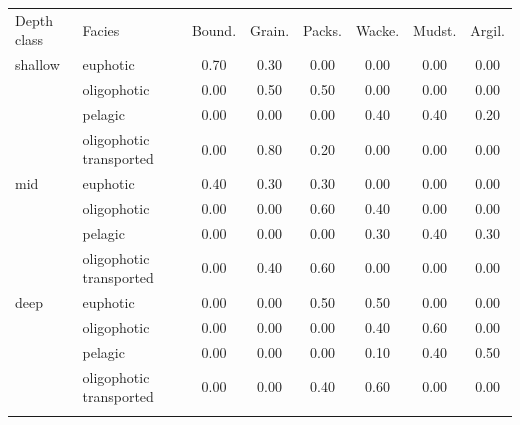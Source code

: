 \begin{tabular}{llcccccc}
\tophline
Depth class & Facies & Bound. & Grain. & Packs. & Wacke. & Mudst. & Argil. \\
\middlehline
shallow & euphotic & 0.70 & 0.30 & 0.00 & 0.00 & 0.00 & 0.00 \\
 & oligophotic & 0.00 & 0.50 & 0.50 & 0.00 & 0.00 & 0.00 \\
 & pelagic & 0.00 & 0.00 & 0.00 & 0.40 & 0.40 & 0.20 \\
 & oligophotic transported & 0.00 & 0.80 & 0.20 & 0.00 & 0.00 & 0.00 \\
mid & euphotic & 0.40 & 0.30 & 0.30 & 0.00 & 0.00 & 0.00 \\
 & oligophotic & 0.00 & 0.00 & 0.60 & 0.40 & 0.00 & 0.00 \\
 & pelagic & 0.00 & 0.00 & 0.00 & 0.30 & 0.40 & 0.30 \\
 & oligophotic transported & 0.00 & 0.40 & 0.60 & 0.00 & 0.00 & 0.00 \\
deep & euphotic & 0.00 & 0.00 & 0.50 & 0.50 & 0.00 & 0.00 \\
 & oligophotic & 0.00 & 0.00 & 0.00 & 0.40 & 0.60 & 0.00 \\
 & pelagic & 0.00 & 0.00 & 0.00 & 0.10 & 0.40 & 0.50 \\
 & oligophotic transported & 0.00 & 0.00 & 0.40 & 0.60 & 0.00 & 0.00 \\
\bottomhline
\end{tabular}
